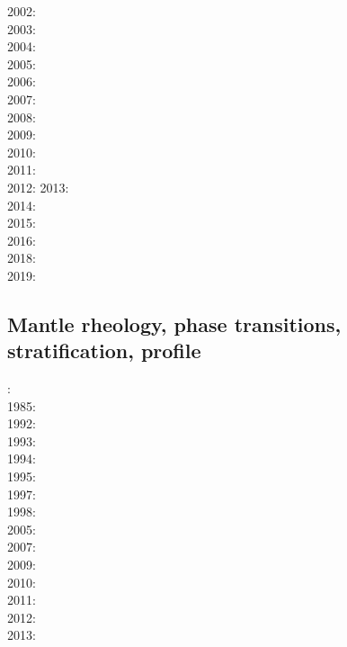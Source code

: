 2002: \cite{tasu02}\cite{modm02}\cite{tack02}\\
2003: \cite{hapa03}\cite{lemo03}\cite{mumc03}\\
2004: \cite{vavv04b}\\
2005: \cite{taxn05}\cite{bupc05}\cite{grlt05}\cite{lemj05}\\
2006: \cite{beck06}\\
2007: \cite{nake07}\cite{mayu07}\cite{brva07a}\cite{brva07b}\cite{grlt07}\cite{grlt07b}\\
2008: \cite{tack08}\cite{chhl08}\cite{brhv08}\cite{deta08}\\
2009: \cite{wodd09}\cite{fobe09}\cite{gows09}\cite{deta09}\\
2010: \cite{bumb10}\cite{detn10}\cite{yayh10}\\
2011: \cite{lowm11}\cite{rota11}\cite{woda11}\cite{lemj11}\\
2012: \cite{bisa12}\cite{cort12b}\cite{deyt12}
2013: \cite{holj13}\cite{dadb13}\cite{toyd13}\cite{bogs13a}\cite{busa13}\cite{mika13}
      \cite{fabc13}\cite{cosr13}\cite{coml13}\\
2014: \cite{arfw14}\cite{helo14}\cite{crta14}\cite{flgw14}\cite{roct14}\cite{cort14}\cite{becr14}\\
2015: \cite{thkp15}\cite{wegg15}\cite{bect15}\\
2016: \cite{frbs16}\cite{sisc16}\\
2018: \cite{cold18}\cite{arcf18}\cite{cosh18}\\
2019: \cite{gult19}\cite{mazh19}

\subsection*{Mantle rheology, phase transitions, stratification, profile}

: \cite{yusb82}\cite{chri82}\\
1985: \cite{chyu85}\\
1992: \cite{zhyh92}\\
1993: \cite{tasg93}\cite{best93}\\
1994: \cite{vayv94}\\
1995: \cite{zhyu95}\cite{chri95}\cite{scta95}\\
1997: \cite{mifo97}\\
1998: \cite{cava98}\\
2005: \cite{hett05}\\
2007: \cite{pazw07}\\
2009: \cite{natd09}\\
2010: \cite{kayy10}\\
2011: \cite{java11}\cite{faff11}\\
2012: \cite{tack12}\\
2013: \cite{fakc13}\cite{taab13}


